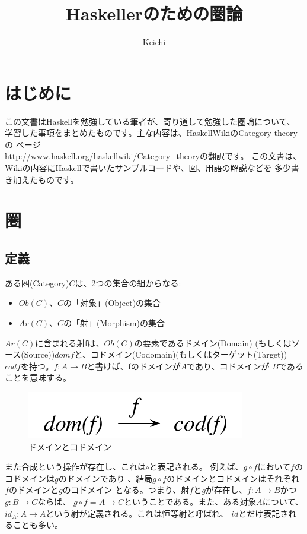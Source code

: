 \documentclass{jsarticle}
\begin{document}
\title{Haskellerのための圏論}
\author{Keichi}
\maketitle

\section{はじめに}
この文書はHaskellを勉強している筆者が、寄り道して勉強した圏論について、
学習した事項をまとめたものです。主な内容は、HaskellWikiのCategory theoryの
ページ\\\url{http://www.haskell.org/haskellwiki/Category_theory}の翻訳です。
この文書は、Wikiの内容にHaskellで書いたサンプルコードや、図、用語の解説などを
多少書き加えたものです。

\section{圏}

\subsection{定義}
ある圏(Category)$C$は、2つの集合の組からなる:

\begin{itemize}
    \item $Ob(C)$、$C$の「対象」(Object)の集合
    \item $Ar(C)$、$C$の「射」(Morphism)の集合
\end{itemize}

$Ar(C)$に含まれる射fは、$Ob(C)$の要素であるドメイン(Domain)
(もしくはソース(Source))$dom f$と、コドメイン(Codomain)(もしくはターゲット(Target))
$cod f$を持つ。$f:A \to B$と書けば、fのドメインが$A$であり、コドメインが
$B$であることを意味する。

\begin{figure}[htbp]
    \centering
    \includegraphics{diag_dom.pdf}
    \caption{ドメインとコドメイン}
\end{figure}

また合成という操作が存在し、これは$\circ$と表記される。
例えば、$g \circ f$において$f$のコドメインは$g$のドメインであり
、結局$g \circ f$のドメインとコドメインはそれぞれ$f$のドメインと$g$のコドメイン
となる。つまり、射$f$と$g$が存在し、$f:A \to B$かつ$g:B \to C$ならば、
$g \circ f = A \to C$ということである。また、ある対象$A$について、
$id_A: A \to A$という射が定義される。これは恒等射と呼ばれ、
$id$とだけ表記されることも多い。
\end{document}
